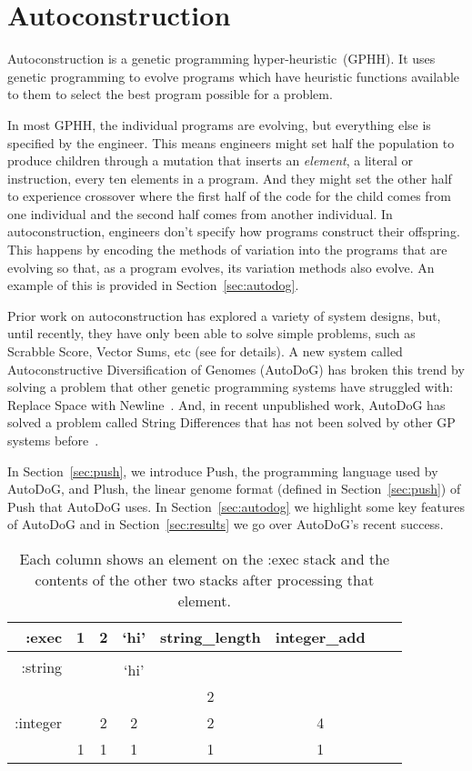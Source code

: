 \documentclass{sig-alternate}
\begin{document}
\section{Autoconstruction}
\label{sec:ac}
Autoconstruction is a genetic programming hyper-heur\-istic~(GPHH). It uses genetic programming to evolve programs which have heuristic functions available to them to select the best program possible for a problem. 

In most GPHH, the individual programs are evolving, but everything else is specified by the engineer. This means engineers might set half the population to produce children through a mutation that inserts an \textit{element}, a literal or instruction, every ten elements in a program. And they might set the other half to experience crossover where the first half of the code for the child comes from one individual and the second half comes from another individual. In autoconstruction, engineers don't specify how programs construct their offspring. This happens by encoding the methods of variation into the programs that are evolving so that, as a program evolves, its variation methods also evolve. An example of this is provided in Section~\ref{sec:autodog}.

Prior work on autoconstruction has explored a variety of system designs, but, until recently, they have only been able to solve simple problems, such as Scrabble Score, Vector Sums, etc (see \cite{helmuth:2015} for details). A new system called Autoconstructive Diversification of Genomes (AutoDoG) has broken this trend by solving a problem that other genetic programming systems have struggled with: Replace Space with Newline~\cite{spector:2016}. And, in recent unpublished work, AutoDoG has solved a problem called String Differences that has not been solved by other GP systems before~\cite{eva:2017}.

In Section~\ref{sec:push}, we introduce Push, the programming language used by AutoDoG, and Plush, the linear genome format (defined in Section~\ref{sec:push}) of Push that AutoDoG uses. In Section~\ref{sec:autodog} we highlight some key features of AutoDoG and in Section~\ref{sec:results} we go over AutoDoG's recent success.

\begin{table}
	\centering
	\begin{tabular}{|r|c|c|c|c|c|c|c|}
		\hline
		:exec & 1 & 2 & `hi' & string\_length & integer\_add \\
		\hline
		\hline
		\multirow{2}{*}{:string} & & & & & \\
		& & & `hi' &  &  \\
		\hline
		\multirow{3}{*}{:integer} & & & & 2 & \\
		& & 2 & 2 & 2 & 4 \\
		& 1 & 1 & 1 & 1 & 1\\
		\hline
	\end{tabular}
	\caption{Each column shows an element on the :exec stack and the contents of the other two stacks after processing that element.}
	\label{tab:push}
\end{table}
\end{document}

